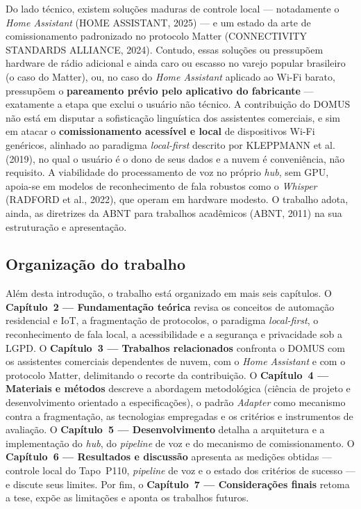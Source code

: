 Do lado técnico, existem soluções maduras de controle local --- notadamente o
\textit{Home Assistant} (HOME ASSISTANT, 2025) --- e um estado da arte de
comissionamento padronizado no protocolo Matter (CONNECTIVITY STANDARDS ALLIANCE,
2024). Contudo, essas soluções ou pressupõem hardware de rádio adicional e ainda caro
ou escasso no varejo popular brasileiro (o caso do Matter), ou, no caso do
\textit{Home Assistant} aplicado ao Wi-Fi barato, pressupõem o \textbf{pareamento
prévio pelo aplicativo do fabricante} --- exatamente a etapa que exclui o usuário não
técnico. A contribuição do DOMUS não está em disputar a sofisticação linguística dos
assistentes comerciais, e sim em atacar o \textbf{comissionamento acessível e local} de
dispositivos Wi-Fi genéricos, alinhado ao paradigma \textit{local-first} descrito por
KLEPPMANN et al. (2019), no qual o usuário é o dono de seus dados e a nuvem é
conveniência, não requisito. A viabilidade do processamento de voz no próprio
\textit{hub}, sem GPU, apoia-se em modelos de reconhecimento de fala robustos como o
\textit{Whisper} (RADFORD et al., 2022), que operam em hardware modesto. O trabalho
adota, ainda, as diretrizes da ABNT para trabalhos acadêmicos (ABNT, 2011) na sua
estruturação e apresentação.

\subsection{Organização do trabalho}

Além desta introdução, o trabalho está organizado em mais seis capítulos. O
\textbf{Capítulo~2 --- Fundamentação teórica} revisa os conceitos de automação
residencial e IoT, a fragmentação de protocolos, o paradigma \textit{local-first}, o
reconhecimento de fala local, a acessibilidade e a segurança e privacidade sob a LGPD.
O \textbf{Capítulo~3 --- Trabalhos relacionados} confronta o DOMUS com os assistentes
comerciais dependentes de nuvem, com o \textit{Home Assistant} e com o protocolo
Matter, delimitando o recorte da contribuição. O \textbf{Capítulo~4 --- Materiais e
métodos} descreve a abordagem metodológica (ciência de projeto e desenvolvimento
orientado a especificações), o padrão \textit{Adapter} como mecanismo contra a
fragmentação, as tecnologias empregadas e os critérios e instrumentos de avaliação. O
\textbf{Capítulo~5 --- Desenvolvimento} detalha a arquitetura e a implementação do
\textit{hub}, do \textit{pipeline} de voz e do mecanismo de comissionamento. O
\textbf{Capítulo~6 --- Resultados e discussão} apresenta as medições obtidas
--- controle local do Tapo~P110, \textit{pipeline} de voz e o estado dos critérios de
sucesso --- e discute seus limites. Por fim, o \textbf{Capítulo~7 --- Considerações
finais} retoma a tese, expõe as limitações e aponta os trabalhos futuros.
